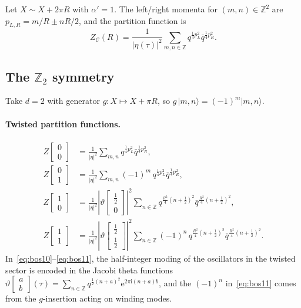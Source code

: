 \documentclass[11pt,a4paper]{article}
\theoremstyle{plain}
\theoremstyle{definition}
\theoremstyle{remark}
\newcommand{\ZZ}{\mathbb{Z}}
\newcommand{\Ztwo}{\mathbb{Z}_2}
\newcommand{\Cft}{\mathcal{C}}
\newcommand{\ii}{\mathrm{i}}
\newcommand{\ee}{\mathrm{e}}
\newcommand{\partfn}[2]{Z\!\begin{bmatrix}#1\\#2\end{bmatrix}}
\newcommand{\abs}[1]{\lvert #1 \rvert}
\begin{document}
Let $X \sim X + 2\pi R$ with $\alpha' = 1$.  The left/right momenta
for $(m,n)\in\ZZ^2$ are $p_{L,R} = m/R \pm nR/2$, and the partition
function is
\[
  Z_{\Cft}(R)
  = \frac{1}{\abs{\eta(\tau)}^2}
    \sum_{m,n\in\ZZ} q^{\frac{1}{4}p_L^2}\bar{q}^{\frac{1}{4}p_R^2}.
\]

\subsection{The $\Ztwo$ symmetry}

Take $d=2$ with generator $g: X\mapsto X + \pi R$, so
$g\,\lvert m,n\rangle = (-1)^m\lvert m,n\rangle$.

\paragraph{Twisted partition functions.}
\begin{align}
  \partfn{0}{0} &= \frac{1}{\abs{\eta}^2}\sum_{m,n}
    q^{\frac{1}{4}p_L^2}\bar{q}^{\frac{1}{4}p_R^2},
  \label{eq:bos00}\\[4pt]
  \partfn{0}{1} &= \frac{1}{\abs{\eta}^2}\sum_{m,n}
    (-1)^m\,q^{\frac{1}{4}p_L^2}\bar{q}^{\frac{1}{4}p_R^2},
  \label{eq:bos01}\\[4pt]
  \partfn{1}{0} &= \frac{1}{\abs{\eta}^2}
    \left\lvert\vartheta\!\begin{bmatrix}\frac{1}{2}\\0\end{bmatrix}\right\rvert^2
    \sum_{n\in\ZZ}q^{\frac{R^2}{4}(n+\frac{1}{2})^2}
    \bar{q}^{\frac{R^2}{4}(n+\frac{1}{2})^2},
  \label{eq:bos10}\\[4pt]
  \partfn{1}{1} &= \frac{1}{\abs{\eta}^2}
    \left\lvert\vartheta\!\begin{bmatrix}\frac{1}{2}\\\frac{1}{2}\end{bmatrix}\right\rvert^2
    \sum_{n\in\ZZ}(-1)^n\,
    q^{\frac{R^2}{4}(n+\frac{1}{2})^2}
    \bar{q}^{\frac{R^2}{4}(n+\frac{1}{2})^2}.
  \label{eq:bos11}
\end{align}
In~\eqref{eq:bos10}--\eqref{eq:bos11}, the half-integer moding of the
oscillators in the twisted sector is encoded in the Jacobi theta functions
$\vartheta\!\begin{bmatrix}a\\b\end{bmatrix}(\tau)
=\sum_{n\in\ZZ}q^{\frac{1}{2}(n+a)^2}\ee^{2\pi\ii(n+a)b}$,
and the $(-1)^n$ in~\eqref{eq:bos11} comes from the $g$-insertion
acting on winding modes.
\end{document}

